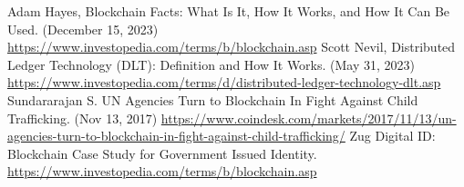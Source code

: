 \singlespace
{}
\begin{thebibliography}{}
   Adam Hayes, Blockchain Facts: What Is It, How It Works, and How It Can Be Used. (December 15, 2023) \url{https://www.investopedia.com/terms/b/blockchain.asp}
   Scott Nevil, Distributed Ledger Technology (DLT): Definition and How It Works. (May 31, 2023) \url{https://www.investopedia.com/terms/d/distributed-ledger-technology-dlt.asp}
    Sundararajan S. UN Agencies Turn to Blockchain In Fight Against Child Trafficking. (Nov 13, 2017)  \url{https://www.coindesk.com/markets/2017/11/13/un-agencies-turn-to-blockchain-in-fight-against-child-trafficking/}
   Zug Digital ID: Blockchain Case Study for Government Issued Identity.  \url{https://www.investopedia.com/terms/b/blockchain.asp}



\end{thebibliography}